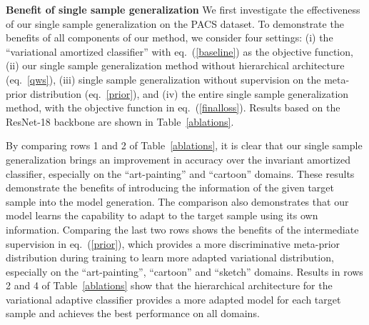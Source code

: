 \documentclass{article} \usepackage[table]{xcolor}
\begin{document}
\textbf{Benefit of single sample generalization}
We first investigate the effectiveness of our single sample generalization on the PACS dataset.
To demonstrate the benefits of all components of our method, we consider four settings: 
(i) the ``variational amortized classifier'' with eq.~(\ref{baseline}) as the objective function, (ii) our single sample generalization method without hierarchical architecture (eq.~\ref{qws}), (iii) single sample generalization without supervision on the meta-prior distribution (eq.~\ref{prior}), and (iv) the entire single sample generalization method, with the objective function in eq.~(\ref{finalloss}). 
Results based on the ResNet-18 backbone are shown in Table~\ref{ablations}.



By comparing rows 1 and 2 of Table~\ref{ablations}, it is clear that our single sample generalization brings an improvement in accuracy over the invariant amortized classifier, especially on the ``art-painting'' and ``cartoon'' domains. 
These results demonstrate the benefits of introducing the information of the given target sample into the model generation. The comparison also demonstrates that our model learns the capability to adapt to the target sample using its own information.
Comparing the last two rows shows the benefits of the intermediate supervision in eq.~(\ref{prior}), which provides a more discriminative meta-prior distribution during training to learn more adapted variational distribution, especially on the ``art-painting'', ``cartoon'' and ``sketch'' domains.
Results in rows 2 and 4 of Table~\ref{ablations} show that the hierarchical architecture for the variational adaptive classifier  provides a more adapted model for each target sample and achieves the best performance on all domains.
\end{document}
